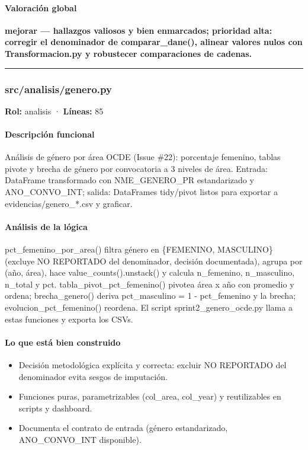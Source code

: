 \paragraph{Valoración global}
\textbf{mejorar --- hallazgos valiosos y bien enmarcados; prioridad alta: corregir el denominador de comparar\_dane(), alinear valores nulos con Transformacion.py y robustecer comparaciones de cadenas.}

\medskip
\hrule

\subsubsection{src/analisis/genero.py}
\textbf{Rol:} analisis · \textbf{Líneas:} 85

\paragraph{Descripción funcional}
Análisis de género por área OCDE (Issue \#22): porcentaje femenino, tablas pivote y brecha de género por convocatoria a 3 niveles de área. Entrada: DataFrame transformado con NME\_GENERO\_PR estandarizado y ANO\_CONVO\_INT; salida: DataFrames tidy/pivot listos para exportar a evidencias/genero\_*.csv y graficar.

\paragraph{Análisis de la lógica}
pct\_femenino\_por\_area() filtra género en \{FEMENINO, MASCULINO\} (excluye NO REPORTADO del denominador, decisión documentada), agrupa por (año, área), hace value\_counts().unstack() y calcula n\_femenino, n\_masculino, n\_total y pct. tabla\_pivot\_pct\_femenino() pivotea área x año con promedio y ordena; brecha\_genero() deriva pct\_masculino = 1 - pct\_femenino y la brecha; evolucion\_pct\_femenino() reordena. El script sprint2\_genero\_ocde.py llama a estas funciones y exporta los CSVs.

\paragraph{Lo que está bien construido}
\begin{itemize}
  \item Decisión metodológica explícita y correcta: excluir NO REPORTADO del denominador evita sesgos de imputación.
  \item Funciones puras, parametrizables (col\_area, col\_year) y reutilizables en scripts y dashboard.
  \item Documenta el contrato de entrada (género estandarizado, ANO\_CONVO\_INT disponible).
\end{itemize}

